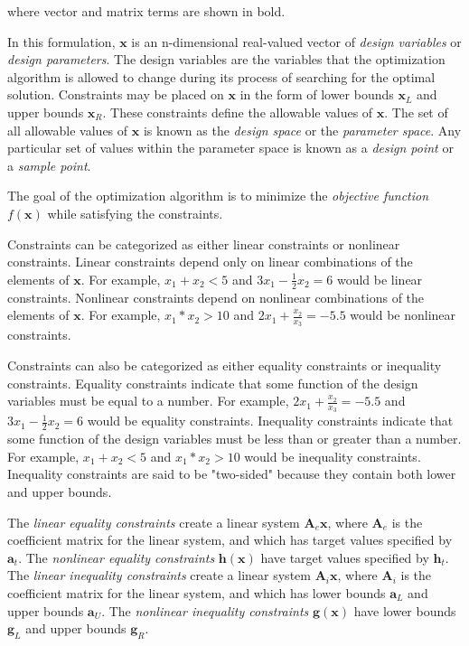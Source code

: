 where vector and matrix terms are shown in bold.

In this formulation, $\textbf{x}$ is an n-dimensional real-valued vector of \textit{design variables} or \textit{design parameters}.
The design variables are the variables that the optimization algorithm is allowed to change during its process of searching for the optimal solution.
Constraints may be placed on $\textbf{x}$ in the form of lower bounds $\textbf{x}_L$ and upper bounds $\textbf{x}_R$.
These constraints define the allowable values of $\textbf{x}$.
The set of all allowable values of $\textbf{x}$ is known as the \textit{design space} or the \textit{parameter space}.
Any particular set of values within the parameter space is known as a \textit{design point} or a \textit{sample point}.

The goal of the optimization algorithm is to minimize the \textit{objective function} $f\left(\textbf{x}\right)$ while satisfying the constraints.

Constraints can be categorized as either linear constraints or nonlinear constraints.
Linear constraints depend only on linear combinations of the elements of $\textbf{x}$.
For example, $x_1 + x_2 < 5$ and $3x_1 - \frac{1}{2}x_2 = 6$ would be linear constraints.
Nonlinear constraints depend on nonlinear combinations of the elements of $\textbf{x}$.
For example, $x_1 * x_2 > 10$ and $2x_1 + \frac{x_2}{x_3} = -5.5$ would be nonlinear constraints.

Constraints can also be categorized as either equality constraints or inequality constraints.
Equality constraints indicate that some function of the design variables must be equal to a number.
For example, $2x_1 + \frac{x_2}{x_3} = -5.5$ and $3x_1 - \frac{1}{2}x_2 = 6$ would be equality constraints.
Inequality constraints indicate that some function of the design variables must be less than or greater than a number.
For example, $x_1 + x_2 < 5$ and $x_1 * x_2 > 10$ would be inequality constraints.
Inequality constraints are said to be "two-sided" because they contain both lower and upper bounds.

The \textit{linear equality constraints} create a linear system $\textbf{A}_e\textbf{x}$, where ${\textbf{A}_e}$ is the coefficient matrix for the linear system, and which has target values specified by ${\textbf{a}_t}$.
The \textit{nonlinear equality constraints} ${\textbf{h}\left(\textbf{x}\right)}$ have target values specified by $\textbf{h}_t$.
The \textit{linear inequality constraints} create a linear system $\textbf{A}_i\textbf{x}$, where ${\textbf{A}_i}$ is the coefficient matrix for the linear system, and which has lower bounds $\textbf{a}_L$ and upper bounds $\textbf{a}_U$.
The \textit{nonlinear inequality constraints} $\textbf{g}\left(\textbf{x}\right)$ have lower bounds $\textbf{g}_L$ and upper bounds $\textbf{g}_R$.

